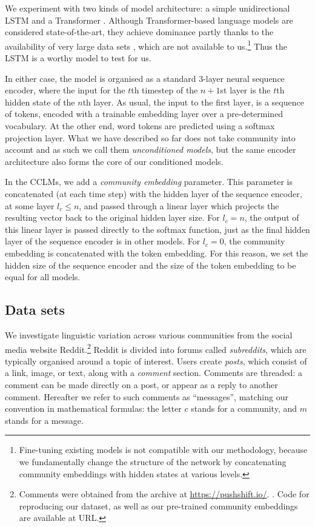 \documentclass[11pt]{article}
\begin{document}
We experiment with two kinds of model architecture: a simple
unidirectional LSTM \citep{Hochreiter1997} and a Transformer
\citep{Vaswani2017}. Although Transformer-based language models are considered
state-of-the-art, they achieve dominance partly thanks to the
availability of very large data sets \citep[e.g.,][]{Devlin2019,Brown2020},
which are not available to us.\footnote{Fine-tuning existing models
  is not compatible with our methodology, because we fundamentally
  change the structure of the network by concatenating
  community embeddings with hidden states at various levels.} Thus the LSTM is a worthy model to test for us.

In either case, the model is organised as a
standard $3$-layer neural sequence encoder, where the input for the
$t$th timestep of the $n+1$st layer is the $t$th hidden state of the 
$n$th layer.
As usual, the input to the first layer, is a sequence of tokens,
encoded with a trainable embedding layer over a pre-determined vocabulary.
At the other end, word tokens are predicted using a softmax projection 
layer. What we have described so far does not take community into account
and as such we call them \emph{unconditioned models}, but the same
encoder architecture also forms the core of our conditioned models.

In the CCLMs, we add a \emph{community embedding} parameter.
This parameter is concatenated (at each time step) with the hidden layer of the
sequence encoder, at some layer $l_c \leq n$, and passed through a
linear layer which projects the resulting vector back to the original
hidden layer size.  For $l_c = n$, the output of this linear layer is
passed directly to the softmax function, just as the final hidden
layer of the sequence encoder is in other models.  For $l_c=0$, the
community embedding is concatenated with the token embedding.  For
this reason, we set the hidden size of the sequence encoder and the
size of the token embedding to be equal for all models.


\subsection{Data sets}\label{sec:data}

We investigate linguistic variation across various communities 
from the social media website Reddit.\footnote{Comments were obtained
  from the archive at \url{https://pushshift.io/}.
  \cite{Baumgartner2020}. Code for reproducing our dataset, as well as
 our pre-trained community embeddings are available at URL.} %
%
Reddit is divided into forums called \textit{subreddits}, 
which are typically organised around a topic of interest. 
Users create \textit{posts}, which consist of a link, image, 
or text, along with a \emph{comment} section. 
Comments are threaded: a comment can be made directly on a post,
or appear as a reply to another comment.
%
Hereafter we refer to such comments as ``messages'', matching our
convention in mathematical formulas: the letter $c$ stands for a
community, and $m$ stands for a message.
\end{document}
